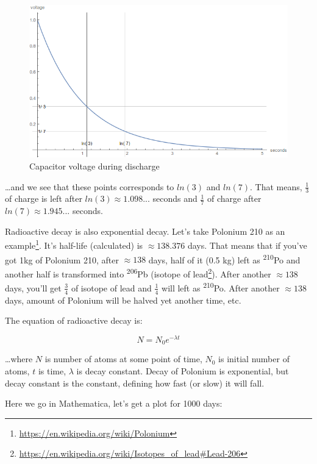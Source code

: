 \begin{figure}[H]
\centering
\includegraphics[scale=0.66]{log/capacitor_discharge2.png}
\caption{Capacitor voltage during discharge}
\end{figure}

\dots and we see that these points corresponds to $ln(3)$ and $ln(7)$.
That means, $\frac{1}{3}$ of charge is left after $ln(3) \approx 1.098...$ seconds and $\frac{1}{7}$ of charge after $ln(7) \approx 1.945...$ seconds.


Radioactive decay is also exponential decay.
Let's take Polonium 210 as an example\footnote{\url{https://en.wikipedia.org/wiki/Polonium}}.
It's half-life (calculated) is $\approx 138.376$ days.
That means that if you've got 1kg of Polonium 210, after $\approx 138$ days, half of it (0.5 kg) left as \textsuperscript{210}Po and 
another half is transformed into \textsuperscript{206}Pb (isotope of lead\footnote{\url{https://en.wikipedia.org/wiki/Isotopes_of_lead\#Lead-206}}).
After another $\approx 138$ days, you'll get $\frac{3}{4}$ of isotope of lead and $\frac{1}{4}$ will left as \textsuperscript{210}Po.
After another $\approx 138$ days, amount of Polonium will be halved yet another time, etc.

The equation of radioactive decay is:

\[
N=N_{0}e^{-\lambda t}
\]

\dots where $N$ is number of atoms at some point of time, $N_{0}$ is initial number of atoms, $t$ is time, $\lambda$ is decay constant.
Decay of Polonium is exponential, but decay constant is the constant, defining how fast (or slow) it will fall.

Here we go in Mathematica, let's get a plot for 1000 days:

